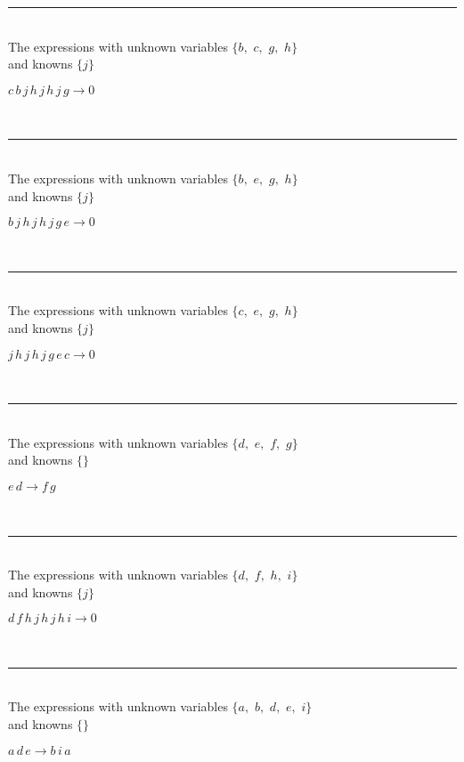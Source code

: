 \rule[3pt]{6in}{.7pt}\\
The expressions with unknown variables $\{b,
$ $
c,
$ $
g,
$ $
h\}$\\
and knowns $\{j\}$\smallskip\\
\begin{minipage}{6in}
$
c\,
 b\,
 j\,
 h\,
 j\,
 h\,
 j\,
 g\rightarrow 0
$
\end{minipage}\\
\rule[3pt]{6in}{.7pt}\\
The expressions with unknown variables $\{b,
$ $
e,
$ $
g,
$ $
h\}$\\
and knowns $\{j\}$\smallskip\\
\begin{minipage}{6in}
$
b\,
 j\,
 h\,
 j\,
 h\,
 j\,
 g\,
 e\rightarrow 0
$
\end{minipage}\\
\rule[3pt]{6in}{.7pt}\\
The expressions with unknown variables $\{c,
$ $
e,
$ $
g,
$ $
h\}$\\
and knowns $\{j\}$\smallskip\\
\begin{minipage}{6in}
$
j\,
 h\,
 j\,
 h\,
 j\,
 g\,
 e\,
 c\rightarrow 0
$
\end{minipage}\\
\rule[3pt]{6in}{.7pt}\\
The expressions with unknown variables $\{d,
$ $
e,
$ $
f,
$ $
g\}$\\
and knowns $\{\}$\smallskip\\
\begin{minipage}{6in}
$
e\,
 d\rightarrow f\,
 g
$
\end{minipage}\\
\rule[3pt]{6in}{.7pt}\\
The expressions with unknown variables $\{d,
$ $
f,
$ $
h,
$ $
i\}$\\
and knowns $\{j\}$\smallskip\\
\begin{minipage}{6in}
$
d\,
 f\,
 h\,
 j\,
 h\,
 j\,
 h\,
 i\rightarrow 0
$
\end{minipage}\\
\rule[3pt]{6in}{.7pt}\\
The expressions with unknown variables $\{a,
$ $
b,
$ $
d,
$ $
e,
$ $
i\}$\\
and knowns $\{\}$\smallskip\\
\begin{minipage}{6in}
$
a\,
 d\,
 e\rightarrow b\,
 i\,
 a
$
\end{minipage}\\
